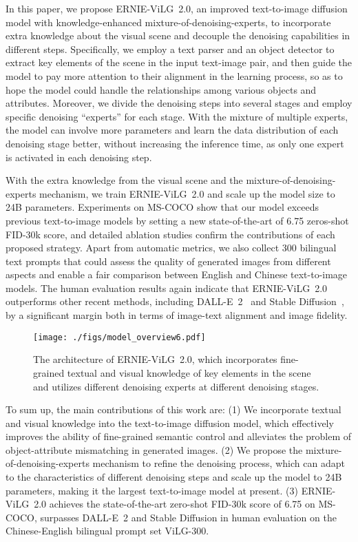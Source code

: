 \documentclass[10pt,twocolumn,letterpaper]{article}
\begin{document}
In this paper, we propose ERNIE-ViLG~2.0, an improved text-to-image diffusion model with knowledge-enhanced mixture-of-denoising-experts, to incorporate extra knowledge about the visual scene and decouple the denoising capabilities in different steps.
Specifically, we employ a text parser and an object detector to extract key elements of the scene in the input text-image pair, and then guide the model to pay more attention to their alignment in the learning process, so as to hope the model could handle the relationships among various objects and attributes.
Moreover, we divide the denoising steps into several stages and employ specific denoising ``experts'' for each stage.
With the mixture of multiple experts, the model can involve more parameters and learn the data distribution of each denoising stage better, without increasing the inference time, as only one expert is activated in each denoising step.

With the extra knowledge from the visual scene and the mixture-of-denoising-experts mechanism, we train ERNIE-ViLG~2.0 and scale up the model size to 24B parameters.
Experiments on MS-COCO show that our model exceeds previous text-to-image models by setting a new state-of-the-art of 6.75 zeros-shot FID-30k score, and detailed ablation studies confirm the contributions of each proposed strategy. 
Apart from automatic metrics, we also collect 300 bilingual text prompts that could assess the quality of generated images from different aspects and enable a fair comparison between English and Chinese text-to-image models.
The human evaluation results again indicate that ERNIE-ViLG~2.0 outperforms other recent methods, including DALL-E~2~\cite{DBLP:journals/corr/abs-2204-06125} and Stable Diffusion~\cite{DBLP:journals/corr/abs-2112-10752}, by a significant margin both in terms of image-text alignment and image fidelity.

\begin{figure*}[t]
    \centering
        \texttt{[image: ./figs/model\_overview6.pdf]}
    \caption{The architecture of ERNIE-ViLG~2.0, which incorporates fine-grained textual and visual knowledge of key elements in the scene and utilizes different denoising experts at different denoising stages.}
    \label{fig:model_structure}
\end{figure*}

To sum up, the main contributions of this work are: (1) We incorporate textual and visual knowledge into the text-to-image diffusion model, which effectively improves the ability of fine-grained semantic control and alleviates the problem of object-attribute mismatching in generated images. (2) We propose the mixture-of-denoising-experts mechanism to refine the denoising process, which can adapt to the characteristics of different denoising steps and scale up the model to 24B parameters, making it the largest text-to-image model at present. (3) ERNIE-ViLG~2.0 achieves the state-of-the-art zero-shot FID-30k score of 6.75 on MS-COCO, surpasses DALL-E~2 and Stable Diffusion in human evaluation on the Chinese-English bilingual prompt set ViLG-300.
\end{document}
